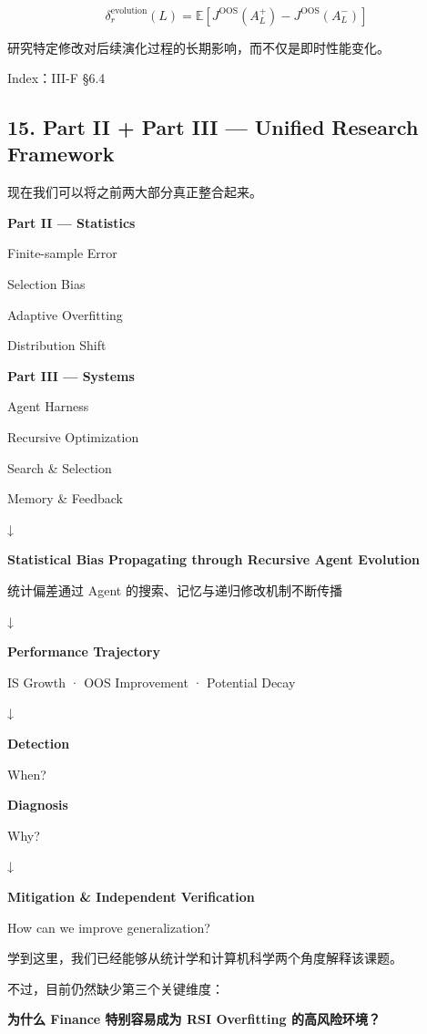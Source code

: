 \[\boxed{
\delta_r^{\mathrm{evolution}}(L)
=
\mathbb E[
J^{\mathrm{OOS}}(A_L^+)
-
J^{\mathrm{OOS}}(A_L^-)
]
}\]

研究特定修改对后续演化过程的长期影响，而不仅是即时性能变化。

Index：III-F §6.4

\hypertarget{part-3-48-0001-part-ii-part-iii-unified-research-framework}{%
\subsection{15. Part II + Part III --- Unified Research Framework}\label{part-3-48-0001-part-ii-part-iii-unified-research-framework}}

现在我们可以将之前两大部分真正整合起来。

\textbf{Part II --- Statistics}

Finite-sample Error

Selection Bias

Adaptive Overfitting

Distribution Shift

\textbf{Part III --- Systems}

Agent Harness

Recursive Optimization

Search \& Selection

Memory \& Feedback

↓

\textbf{Statistical Bias Propagating through Recursive Agent Evolution}

统计偏差通过 Agent 的搜索、记忆与递归修改机制不断传播

↓

\textbf{Performance Trajectory}

IS Growth · OOS Improvement · Potential Decay

↓

\textbf{Detection}

When?

\textbf{Diagnosis}

Why?

↓

\textbf{Mitigation \& Independent Verification}

How can we improve generalization?

学到这里，我们已经能够从统计学和计算机科学两个角度解释该课题。

不过，目前仍然缺少第三个关键维度：

\textbf{为什么 Finance 特别容易成为 RSI Overfitting 的高风险环境？}

